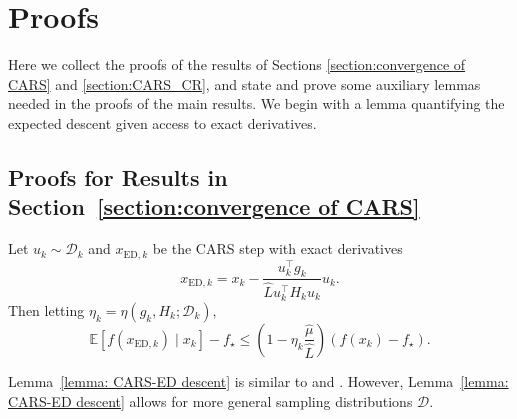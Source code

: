 \section{Proofs}
\label{sec: proofs of main results}

Here we collect the proofs of the results of Sections \ref{section:convergence of CARS} and \ref{section:CARS_CR}, and state and prove some auxiliary lemmas needed in the proofs of the main results. We begin with a lemma quantifying the expected descent given access to exact derivatives.

\subsection{Proofs for Results in Section~\ref{section:convergence of CARS}}
\begin{lemma}
    \label{lemma: CARS-ED descent}
    Let $u_k \sim \mathcal{D}_k$ and $x_{\mathrm{ED}, k}$ be the CARS step with exact derivatives
    \begin{equation}
        x_{\mathrm{ED}, k} = x_k - \frac{u_k^\top g_k}{\hat{L} u_k^\top H_k u_k}u_k.
    \end{equation}
    Then letting $\eta_k = \eta(g_k, H_k; \mathcal{D}_k)$,
    \begin{equation}
        \mathbb{E}\left[f(x_{\mathrm{ED},k}) \mid x_k \right] - f_{\star}\leq  \left(1 - \eta_k \frac{\hat{\mu}}{\hat{L}}\right)(f(x_k) - f_\star).
    \end{equation}
\end{lemma}

\begin{remark}
    Lemma~\ref{lemma: CARS-ED descent} is similar to \cite[Corollary~1]{gower2019rsn} and \cite[Corollary~1 part (ii)]{kozak2021stochastic}. However, Lemma~\ref{lemma: CARS-ED descent} allows for more general sampling distributions $\mathcal{D}$.
\end{remark}

